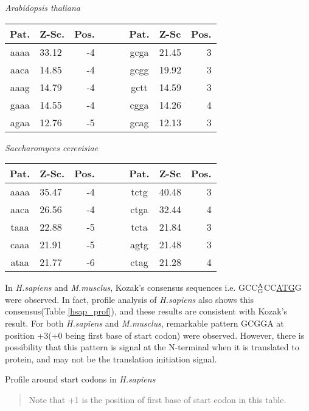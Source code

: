 \vspace{1em}
\noindent
{\it Arabidopsis thaliana}

\noindent
\begin{center}
\begin{tabular}{clrcclr}
Pat. & Z-Sc. & Pos. & \verb+   + & Pat. & Z-Sc & Pos. \\
\hline
aaaa & 33.12 & -4 & & gcga & 21.45 & 3 \\
aaca & 14.85 & -4 & & gcgg & 19.92 & 3 \\
aaag & 14.79 & -4 & & gctt & 14.59 & 3 \\
gaaa & 14.55 & -4 & & cgga & 14.26 & 4 \\
agaa & 12.76 & -5 & & gcag & 12.13 & 3 \\
\end{tabular}
\end{center}

\vspace{1em}
\noindent
{\it Saccharomyces cerevisiae}

\noindent
\begin{center}
\begin{tabular}{clrcclr}
Pat. & Z-Sc. & Pos. & \verb+   + & Pat. & Z-Sc & Pos. \\
\hline
aaaa & 35.47 & -4 & & tctg & 40.48 & 3 \\
aaca & 26.56 & -4 & & ctga & 32.44 & 4 \\
taaa & 22.88 & -5 & & tcta & 21.84 & 3 \\
caaa & 21.91 & -5 & & agtg & 21.48 & 3 \\
ataa & 21.77 & -6 & & ctag & 21.28 & 4 \\
\end{tabular}
\end{center}

\vspace{1em}

In {\it H.sapiens} and {\it M.musclus}, Kozak's consensus sequences
i.e. GCC$^{\rm A}_{\rm G}$CC\underline{ATG}G were observed. In fact,
profile analysis of {\it H.sapiens} also shows this consensus(Table
\ref{hsap_prof}), and these results are consistent with Kozak's
result\cite{label3}. For both {\it H.sapiens} and {\it M.musclus},
remarkable pattern GCGGA at position +3(+0 being first base of start
codon) were observed. However, there is possibility that this pattern
is signal at the N-terminal when it is translated to protein, and may
not be the translation initiation signal.


\begin{table}
\begin{center}
\end{center}
\caption{Profile around start codons in {\it H.sapiens}}
\label{hsap_prof}
\begin{small}
\begin{quotation}
Note that +1 is the position of first base of start codon in this table.
\end{quotation}
\end{small}
\end{table}

